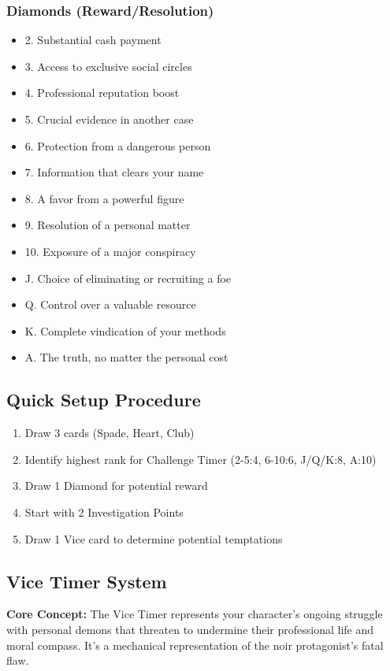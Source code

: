 \documentclass[11pt]{article}
\begin{document}
\subsubsection{Diamonds (Reward/Resolution)}
\begin{itemize}
    \item 2. Substantial cash payment
    \item 3. Access to exclusive social circles
    \item 4. Professional reputation boost
    \item 5. Crucial evidence in another case
    \item 6. Protection from a dangerous person
    \item 7. Information that clears your name
    \item 8. A favor from a powerful figure
    \item 9. Resolution of a personal matter
    \item 10. Exposure of a major conspiracy
    \item J. Choice of eliminating or recruiting a foe
    \item Q. Control over a valuable resource
    \item K. Complete vindication of your methods
    \item A. The truth, no matter the personal cost
\end{itemize}

\subsection{Quick Setup Procedure}
\begin{enumerate}
    \item Draw 3 cards (Spade, Heart, Club)
    \item Identify highest rank for Challenge Timer (2-5:4, 6-10:6, J/Q/K:8, A:10)
    \item Draw 1 Diamond for potential reward
    \item Start with 2 Investigation Points
    \item Draw 1 Vice card to determine potential temptations
\end{enumerate}

\subsection{Vice Timer System}

\textbf{Core Concept:}
The Vice Timer represents your character's ongoing struggle with personal demons that threaten to undermine their professional life and moral compass. It's a mechanical representation of the noir protagonist's fatal flaw.
\end{document}
